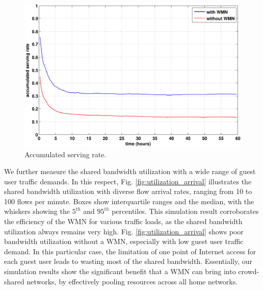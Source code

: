 \begin{figure}[t]
\begin{center}
\includegraphics[width=1\linewidth]{results/acceptance_rate.pdf}
\caption{Accumulated serving rate.}
\label{fig:acceptance}
\end{center}
\end{figure}

We further measure the shared bandwidth utilization with a wide range of guest user traffic demands. In this respect, Fig. \ref{fig:utilization_arrival} illustrates the shared bandwidth utilization with diverse flow arrival rates, ranging from 10 to 100 flows per minute. Boxes show interquartile ranges and the median, with the whiskers showing the $5^{th}$ and $95^{th}$ percentiles. This simulation result corroborates the efficiency of the WMN for various traffic loads, as the shared bandwidth utilization always remains very high. Fig. \ref{fig:utilization_arrival} shows poor bandwidth utilization without a WMN, especially with low guest user traffic demand. In this particular case, the limitation of one point of Internet access for each guest user leads to wasting most of the shared bandwidth. Essentially, our simulation results show the significant benefit that a WMN can bring into crowd-shared networks, by effectively pooling resources across all home networks.

